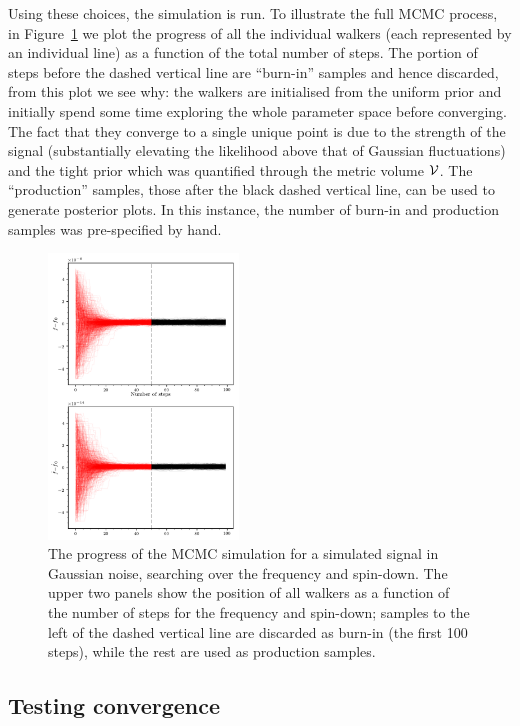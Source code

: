 \documentclass[aps, prd, twocolumn, superscriptaddress, floatfix, showpacs, nofootinbib, longbibliography]{revtex4-1}
\begin{document}
Using these choices, the simulation is run. To illustrate the full MCMC
process, in Figure~\ref{fig_MCMC_simple_example} we plot the progress of all
the individual walkers (each represented by an individual line) as a function
of the total number of steps. The portion of steps before the dashed vertical
line are ``burn-in'' samples and hence discarded, from this plot we see why:
the walkers are initialised from the uniform prior and initially spend some
time exploring the whole parameter space before converging. The fact that they
converge to a single unique point is due to the strength of the signal
(substantially elevating the likelihood above that of Gaussian fluctuations)
and the tight prior which was quantified through the metric volume $\mathcal{V}$. The
``production'' samples, those after the black dashed vertical line, can be used
to generate posterior plots. In this instance, the number of burn-in and
production samples was pre-specified by hand.
\begin{figure}[htb]
\centering
\includegraphics[width=0.45\textwidth]{fully_coherent_search_using_MCMC_walkers}
\caption{The progress of the MCMC simulation for a simulated signal in Gaussian
noise, searching over the frequency and spin-down. The upper two panels show
the position of all walkers as a function of the number of steps for the
frequency and spin-down; samples to the left of the dashed vertical line are discarded as
burn-in (the first 100 steps), while the rest are used
as production samples.}
\label{fig_MCMC_simple_example}
\end{figure}

\subsection{Testing convergence}
\end{document}
